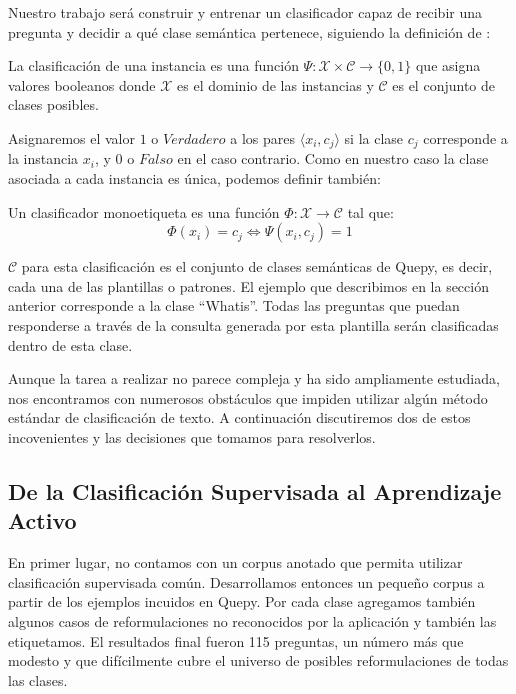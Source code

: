 Nuestro trabajo será construir y entrenar un clasificador capaz de recibir una pregunta y decidir a qué clase semántica pertenece, siguiendo la definición de \citet{Sebastiani-text-categorization}:

\begin{definition}
La clasificación de una instancia es una función $\Psi:\mathcal{X} \times \mathcal{C} \rightarrow \{0, 1\}$ que asigna valores booleanos donde $\mathcal{X}$ es el dominio de las instancias y $\mathcal{C}$ es el conjunto de clases posibles.
\end{definition}

Asignaremos el valor $1$ o $Verdadero$ a los pares $\langle x_i, c_j \rangle$ si la clase $c_j$ corresponde a la instancia $x_i$, y $0$ o $Falso$ en el caso contrario. Como en nuestro caso la clase asociada a cada instancia es única, podemos definir también:

\begin{definition}\label{def-clasificacion}
Un clasificador monoetiqueta es una función $\Phi:\mathcal{X} \rightarrow \mathcal{C}$ tal que:
$$ \Phi(x_i) = c_j \Leftrightarrow \Psi(x_i, c_j) = 1 $$
\end{definition}

$\mathcal{C}$ para esta clasificación es el conjunto de clases semánticas de Quepy, es decir, cada una de las plantillas o patrones. El ejemplo que describimos en la sección anterior corresponde a la clase ``Whatis''. Todas las preguntas que puedan responderse a través de la consulta generada por esta plantilla serán clasificadas dentro de esta clase.




Aunque la tarea a realizar no parece compleja y ha sido ampliamente estudiada, nos encontramos con numerosos obstáculos que impiden utilizar algún método estándar de clasificación de texto. A continuación discutiremos dos de estos incovenientes y las decisiones que tomamos para resolverlos.

\subsection{De la Clasificación Supervisada al Aprendizaje Activo}

En primer lugar, no contamos con un corpus anotado que permita utilizar clasificación supervisada común. Desarrollamos entonces un pequeño corpus a partir de los ejemplos incuidos en Quepy. Por cada clase agregamos también algunos casos de reformulaciones no reconocidos por la aplicación y también las etiquetamos. El resultados final fueron 115 preguntas, un número más que modesto y que difícilmente cubre el universo de posibles reformulaciones de todas las clases.

